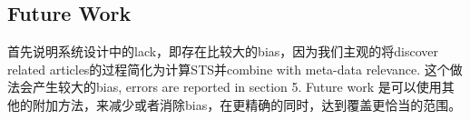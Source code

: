 \subsection{Future Work}
首先说明系统设计中的lack，即存在比较大的bias，因为我们主观的将discover related articles的过程简化为计算STS并combine with meta-data relevance. 这个做法会产生较大的bias, errors are reported in section 5. Future work 是可以使用其他的附加方法，来减少或者消除bias，在更精确的同时，达到覆盖更恰当的范围。
